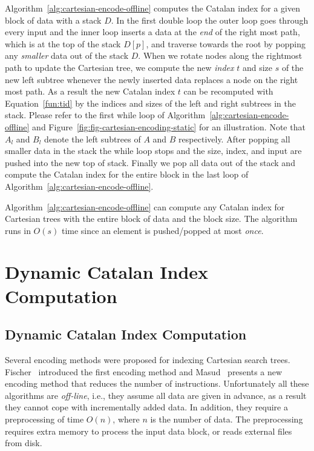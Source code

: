 Algorithm~\ref{alg:cartesian-encode-offline} computes the Catalan
index for a given block of data with a stack $D$.  In the first double
loop the outer loop goes through every input and the inner loop
inserts a data at the {\em end} of the right most path, which is at
the top of the stack $D[p]$, and traverse towards the root by popping
any {\em smaller} data out of the stack $D$.  When we rotate nodes
along the rightmost path to update the Cartesian tree, we compute the
new {\em index} $t$ and size $s$ of the new left subtree whenever the
newly inserted data replaces a node on the right most path.  As a
result the new Catalan index $t$ can be recomputed with
Equation~\ref{fun:tid} by the indices and sizes of the left and right
subtrees in the stack.  Please refer to the first while loop of
Algorithm~\ref{alg:cartesian-encode-offline} and
Figure~\ref{fig:fig-cartesian-encoding-static} for an illustration.
Note that $A_l$ and $B_l$ denote the left subtrees of $A$ and $B$
respectively.  After popping all smaller data in the stack the while
loop stops and the size, index, and input are pushed into the new top
of stack.  Finally we pop all data out of the stack and compute the
Catalan index for the entire block in the last loop of
Algorithm~\ref{alg:cartesian-encode-offline}.

Algorithm~\ref{alg:cartesian-encode-offline} can compute any Catalan
index for Cartesian trees with the entire block of data and the block
size.  The algorithm runs in $O(s)$ time since an element is
pushed/popped at most {\em once}.

\ifdefined\MasterThesis
\section{Dynamic Catalan Index Computation}
\else
\subsection{Dynamic Catalan Index Computation}
\fi

Several encoding methods were proposed for indexing Cartesian search
trees.  Fischer~\cite{Fischer2006TheoreticalAP} introduced the first
encoding method and Masud~\cite{Hasan2010CacheOA} presents a new
encoding method that reduces the number of instructions.
Unfortunately all these algorithms are {\em off-line}, i.e., they
assume all data are given in advance, as a result they cannot cope
with incrementally added data.  In addition, they require a
preprocessing of time $O(n)$, where $n$ is the number of data.  The
preprocessing requires extra memory to process the input data block,
or reads external files from disk.


